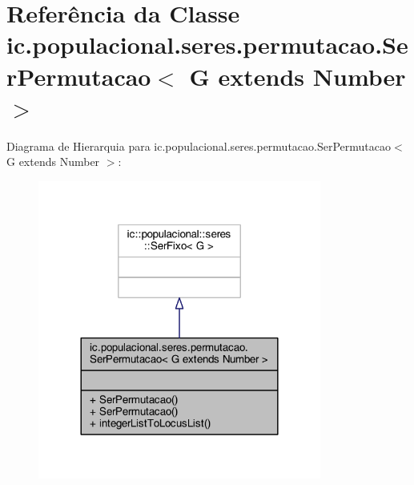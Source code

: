\hypertarget{classic_1_1populacional_1_1seres_1_1permutacao_1_1_ser_permutacao_3_01_g_01extends_01_number_01_4}{\section{Referência da Classe ic.\-populacional.\-seres.\-permutacao.\-Ser\-Permutacao$<$ G extends Number $>$}
\label{classic_1_1populacional_1_1seres_1_1permutacao_1_1_ser_permutacao_3_01_g_01extends_01_number_01_4}
}


Diagrama de Hierarquia para ic.\-populacional.\-seres.\-permutacao.\-Ser\-Permutacao$<$ G extends Number $>$\-:\nopagebreak
\begin{figure}[H]
\begin{center}
\leavevmode
\includegraphics[width=264pt]{classic_1_1populacional_1_1seres_1_1permutacao_1_1_ser_permutacao_3_01_g_01extends_01_number_01_4__inherit__graph}
\end{center}
\end{figure}


